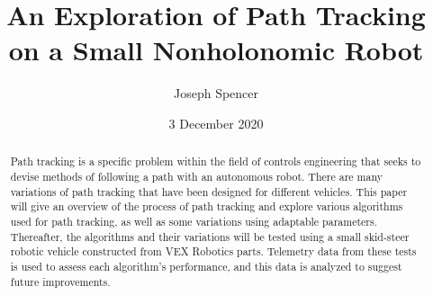 \documentclass[mla7]{mla}
\title{An Exploration of Path Tracking on a Small Nonholonomic Robot}
\author{Joseph Spencer}
\date{3 December 2020}
\begin{document}
\begin{abstract}

Path tracking is a specific problem within the field of controls engineering that seeks to devise methods of following a path with an autonomous robot. There are many variations of path tracking that have been designed for different vehicles. This paper will give an overview of the process of path tracking and explore various algorithms used for path tracking, as well as some variations using adaptable parameters. Thereafter, the algorithms and their variations will be tested using a small skid-steer robotic vehicle constructed from VEX Robotics parts. Telemetry data from these tests is used to assess each algorithm's performance, and this data is analyzed to suggest future improvements.

\end{abstract}
\end{document}
